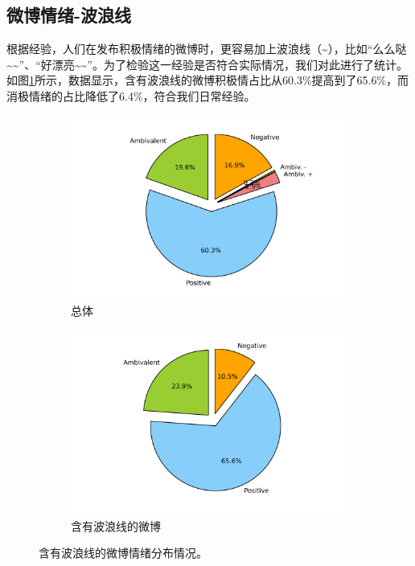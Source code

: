 \documentclass[12pt, oneside]{article}
\begin{document}
\begin{spacing}{1.5}
\begin{CJK}{UTF8}{gbsn}
\subsection{微博情绪-波浪线}
根据经验，人们在发布积极情绪的微博时，更容易加上波浪线（\~{}），比如“么么哒\~{}\~{}”、“好漂亮\~{}\~{}”。为了检验这一经验是否符合实际情况，我们对此进行了统计。如图\ref{fig:emotion_tilde}所示，数据显示，含有波浪线的微博积极情占比从60.3\%提高到了65.6\%，而消极情绪的占比降低了6.4\%，符合我们日常经验。

\begin{figure}
	\centering
	\begin{subfigure}[b]{0.45\linewidth}
		\centering
		\includegraphics[trim = 1.5cm 0 1.5cm 0, clip = true, width=\textwidth]{../result/charts/emotion_identification_all}
		\caption{总体}
	\end{subfigure}
	\begin{subfigure}[b]{0.45\linewidth}
		\centering
		\includegraphics[trim = 1.5cm 0 1.5cm 0, clip = true, width=\textwidth]{../result/charts/emotion_tilde}
		\caption{含有波浪线的微博}
	\end{subfigure}
	\caption{含有波浪线的微博情绪分布情况。}
	\label{fig:emotion_tilde}
\end{figure}


\end{CJK}
\end{spacing}
\end{document}

